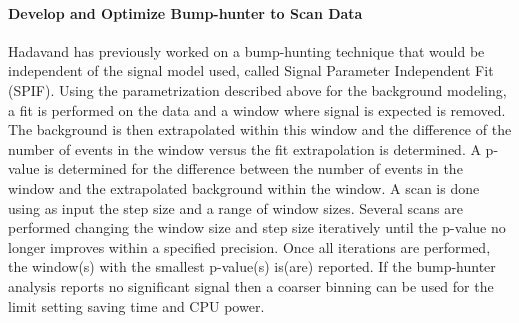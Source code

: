 \paragraph{Develop and Optimize Bump-hunter to Scan Data} %
Hadavand has previously worked on a bump-hunting technique that would be independent of the signal model used, called Signal Parameter Independent Fit (SPIF).  Using the parametrization described above for the background modeling, a fit is performed on the data and a window where signal is expected is removed.
The background is then extrapolated within this window and the difference of the number of events in the window versus the fit extrapolation is determined.  A p-value is determined for the difference between the number of events in the window and the extrapolated background within the window.
A scan is done using as input the step size and a range of window sizes.  Several scans are performed changing the window size and step size iteratively until the p-value no longer improves within a specified precision.
Once all iterations are performed, the window(s) with the smallest p-value(s) is(are) reported.  
If the bump-hunter analysis reports no significant signal then a coarser binning can be used for the limit setting saving time and CPU power.




